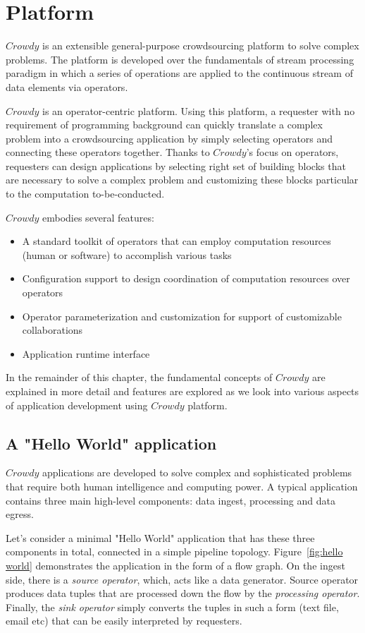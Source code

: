 \chapter{Platform}
\label{chap:platform}

$Crowdy$ is an extensible general-purpose crowdsourcing platform to solve 
complex problems. The platform is developed over the fundamentals of stream 
processing paradigm in which a series of operations are applied to the continuous 
stream of data elements via operators.

$Crowdy$ is an operator-centric platform. Using this platform, a requester with no 
requirement of programming background can quickly translate a complex problem into 
a crowdsourcing application by simply selecting operators and connecting these operators 
together. Thanks to $Crowdy$'s focus on operators, requesters can design applications 
by selecting right set of building blocks that are necessary to solve a complex problem 
and customizing these blocks particular to the computation to-be-conducted.

$Crowdy$ embodies several features:
\begin{itemize}
	\item A standard toolkit of operators that can employ computation resources 
	(human or software) to accomplish various tasks
	\item Configuration support to design coordination of computation resources 
	over operators
	\item Operator parameterization and customization for support of customizable 
	collaborations
	\item Application runtime interface
\end{itemize}

In the remainder of this chapter, the fundamental concepts of $Crowdy$ are explained 
in more detail and features are explored as we look into various aspects of application 
development using $Crowdy$ platform.

\section{A "Hello World" application}
$Crowdy$ applications are developed to solve complex and sophisticated problems 
that require both human intelligence and computing power. A typical application contains 
three main high-level components: data ingest, processing and data egress.

Let's consider a minimal "Hello World" application that has these three components 
in total, connected in a simple pipeline topology. Figure~\ref{fig:hello world} demonstrates 
the application in the form of a flow graph. On the ingest side, there is a 
\textit{source operator}, which, acts like a data generator. Source operator produces 
data tuples that are processed down the flow by the 
\textit{processing operator}. Finally, the \textit{sink operator} simply converts the tuples 
in such a form (text file, email etc) that can be easily interpreted by requesters.

